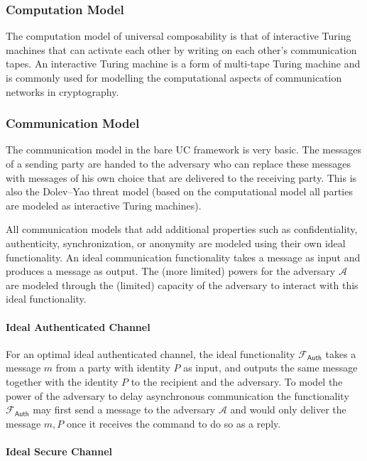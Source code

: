 \documentclass{article}
\begin{document}
\subsubsection{Computation Model}

The computation model of universal composability is that of interactive Turing
machines that can activate each other by writing on each other's communication
tapes. An interactive Turing machine is a form of multi-tape Turing machine and
is commonly used for modelling the computational aspects of communication
networks in cryptography.

\subsubsection{Communication Model}

The communication model in the bare UC framework is very basic. The messages of
a sending party are handed to the adversary who can replace these messages with
messages of his own choice that are delivered to the receiving party. This is
also the Dolev--Yao threat model (based on the computational model all parties
are modeled as interactive Turing machines).

All communication models that add additional properties such as confidentiality,
authenticity, synchronization, or anonymity are modeled using their own ideal
functionality. An ideal communication functionality takes a message as input and
produces a message as output. The (more limited) powers for the adversary
$\mathcal{A}$ are modeled through the (limited) capacity of the adversary to
interact with this ideal functionality.

\paragraph{Ideal Authenticated Channel}

For an optimal ideal authenticated channel, the ideal functionality
$\mathcal{F}_{\mathsf{Auth}}$ takes a message $m$ from a party with identity $P$
as input, and outputs the same message together with the identity $P$ to the
recipient and the adversary. To model the power of the adversary to delay
asynchronous communication the functionality $\mathcal{F}_{\mathsf{Auth}}$ may
first send a message to the adversary $\mathcal{A}$ and would only deliver the
message $m,P$ once it receives the command to do so as a reply.

\paragraph{Ideal Secure Channel}
\end{document}
